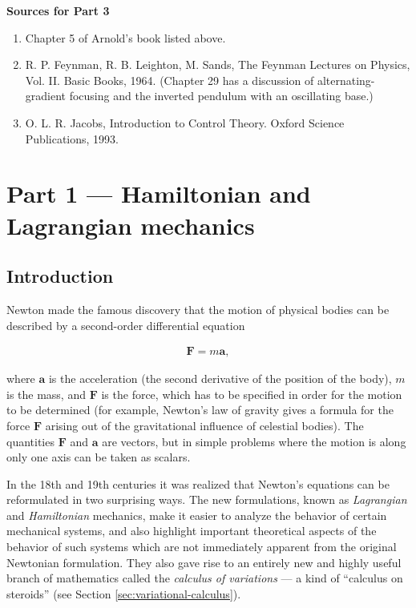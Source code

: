 \documentclass[11pt]{report}
\theoremstyle{plain}
\theoremstyle{definition}
\begin{document}
\textbf{Sources for Part 3}

\begin{enumerate}[label=\arabic*., start=8]
\item Chapter 5 of Arnold's book listed above.

\item R. P. Feynman, R. B. Leighton, M. Sands, The Feynman
Lectures on Physics, Vol. II. Basic Books, 1964.
(Chapter 29 has a discussion of alternating-gradient
focusing and the inverted pendulum with an oscillating
base.)

\item O. L. R. Jacobs, Introduction to Control Theory.
Oxford Science Publications, 1993.
\end{enumerate}

\chapter{Part 1 — Hamiltonian and Lagrangian mechanics}

\section{Introduction}
Newton made the famous discovery that the motion of
physical bodies can be described by a second-order
differential equation

\begin{align*}
\mathbf{F} = m \mathbf{a},
\end{align*}

where $\mathbf{a}$ is the acceleration (the second
derivative of the position of the body), $m$ is the
mass, and $\mathbf{F}$ is the force, which has to be
specified in order for the motion to be determined
(for example, Newton's law of gravity gives a formula
for the force $\mathbf{F}$ arising out of the
gravitational influence of celestial bodies). The
quantities $\mathbf{F}$ and $\mathbf{a}$ are vectors,
but in simple problems where the motion is along only
one axis can be taken as scalars.

In the 18th and 19th centuries it was realized that
Newton's equations can be reformulated in two
surprising ways. The new formulations, known as
\emph{Lagrangian} and \emph{Hamiltonian} mechanics, make it
easier to analyze the behavior of certain mechanical
systems, and also highlight important theoretical
aspects of the behavior of such systems which are not
immediately apparent from the original Newtonian
formulation. They also gave rise to an entirely new
and highly useful branch of mathematics called the
\emph{calculus of variations} --- a kind of ``calculus on
steroids'' (see Section \ref{sec:variational-calculus}).
\end{document}
